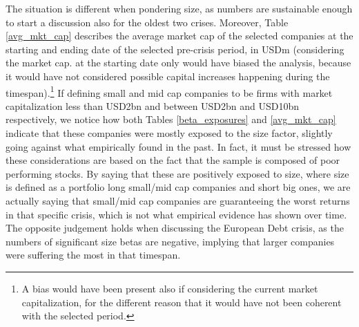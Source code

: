\documentclass[12pt]{article}
\begin{document}
The situation is different when pondering size, as numbers are sustainable enough to start a discussion also for the oldest two crises. Moreover, Table \ref{avg_mkt_cap} describes the average market cap of the selected companies at the starting and ending date of the selected pre-crisis period,  in USDm (considering the market cap. at the starting date only would have biased the analysis, because it would have not considered possible capital increases happening during the timespan).\footnote{A bias would have been present also if considering the current market capitalization, for the different reason that it would have not been coherent with the selected period.} If defining small and mid cap companies to be firms with market capitalization less than USD2bn and between USD2bn and USD10bn respectively, we notice how both Tables \ref{beta_exposures} and \ref{avg_mkt_cap} indicate that these companies were mostly exposed to the size factor, slightly going against what empirically found in the past. In fact, it must be stressed how these considerations are based on the fact that the sample is composed of poor performing stocks. By saying that these are positively exposed to size, where size is defined as a portfolio long small/mid cap companies and short big ones, we are actually saying that small/mid cap companies are guaranteeing the worst returns in that specific crisis, which is not what empirical evidence has shown over time. The opposite judgement holds when discussing the European Debt crisis, as the numbers of significant  size betas are negative, implying that larger companies were suffering the most in that timespan. \\
\end{document}
